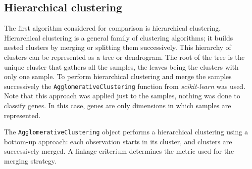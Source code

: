 \subsection{Hierarchical clustering}\label{sec:hc}
The first algorithm considered for comparison is hierarchical clustering. Hierarchical clustering is a general family of clustering algorithms; it builds nested clusters by merging or splitting them successively. This hierarchy of clusters can be represented as a tree or dendrogram. The root of the tree is the unique cluster that gathers all the samples, the leaves being the clusters with only one sample. To perform hierarchical clustering and merge the samples successively the \texttt{AgglomerativeClustering} function from \textit{scikit-learn} was used. Note that this approach was applied just to the samples, nothing was done to classify genes. In this case, genes are only dimensions in which samples are represented.

The \texttt{AgglomerativeClustering} object performs a hierarchical clustering using a bottom-up approach: each observation starts in its cluster, and clusters are successively merged. A linkage criterium determines the metric used for the merging strategy. 

